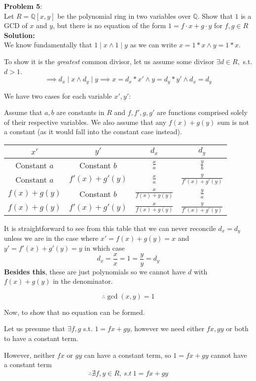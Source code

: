 \documentclass[11pt]{article}
\newcommand{\prob}[3]{\begin{flushleft}
        \textbf{Problem #1}: \\
        #2 
		\textbf{Solution:} 
		#3

\end{flushleft}}
\begin{document}
\prob{5}{
  Let $R = \mathbb{Q}[x,y]$ be the polynomial ring in two variables over $\mathbb{Q}$. Show that $1$ is a GCD of $x$ and $y$,
  but there is no equation of the form $1 = f \cdot x + g \cdot y$ for $f, g \in R$ \\
}{ \\
  We know fundamentally that $1 \mid x \land 1 \mid y$ as we can write $x = 1 * x \land y = 1 * x$.

  To show it is the \emph{greatest} common divisor, let us assume some divisor $\exists d \in R,$ s.t. $d > 1$.
  $$\implies d_x \mid x \land d_y \mid y \implies x = d_x * x' \land y = d_y * y' \land d_x = d_y$$

  We have two cases for each variable $x', y'$:

  Assume that $a,b$ are constants in $R$ and $f, f', g, g'$ are functions comprised solely of their respective variables.
  We also assume that any $f(x) + g(y)$ sum is not a constant (as it would fall into the constant case instead).

  \begin{center}
    \begin{tabular}{| c | c | c | c |} \hline
      $x'$          & $y'$            & $d_x$                   & $d_y$                     \\ \hline
      Constant $a$  & Constant $b$    & $\frac{x}{a}$           & $\frac{y}{b}$             \\ \hline
      Constant $a$  & $f'(x) + g'(y)$ & $\frac{x}{a}$           & $\frac{y}{f'(x) + g'(y)}$ \\ \hline
      $f(x) + g(y)$ & Constant $b$    & $\frac{x}{f(x) + g(y)}$ & $\frac{y}{a}$             \\ \hline
      $f(x) + g(y)$ & $f'(x) + g'(y)$ & $\frac{x}{f(x) + g(y)}$ & $\frac{y}{f'(x) + g'(y)}$ \\ \hline
    \end{tabular}
  \end{center}

  It is straightforward to see from this table that we can never reconcile $d_x = d_y$ unless we are in the case where $x' = f(x) + g(y) = x$ and $y' = f'(x) + g'(y) = y$ in which case
  $$d_x = \frac{x}{x} = 1 = \frac{y}{y} = d_y$$
  \textbf{Besides this}, these are just polynomials so we cannot have $d$ with $f(x) + g(y)$ in the denominator.

  $$\therefore \gcd(x, y) = 1$$

  Now, to show that no equation can be formed.

  Let us presume that $\exists f, g$ s.t. $1 = f x + g y$,
  however we need either $fx, gy$ or both to have a constant term.

  However, neither $fx$ or $gy$ can have a constant term, so
  $1 = fx + gy$ cannot have a constant term
  $$\therefore \nexists f, y \in R,\ s.t\ 1 = fx + gy$$
}
\end{document}
